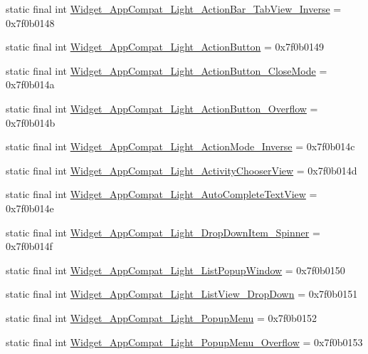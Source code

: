 \begin{CompactItemize}
static final int \hyperlink{classandroid_1_1support_1_1v4_1_1_r_1_1style_18db7314d56f1cc7a9159e040435073f}{Widget\_\-AppCompat\_\-Light\_\-ActionBar\_\-TabView\_\-Inverse} = 0x7f0b0148
\item 
static final int \hyperlink{classandroid_1_1support_1_1v4_1_1_r_1_1style_b0355e7d39a3749bd9d8311346a74916}{Widget\_\-AppCompat\_\-Light\_\-ActionButton} = 0x7f0b0149
\item 
static final int \hyperlink{classandroid_1_1support_1_1v4_1_1_r_1_1style_e76fe722735404aa8f4c087656eb64f1}{Widget\_\-AppCompat\_\-Light\_\-ActionButton\_\-CloseMode} = 0x7f0b014a
\item 
static final int \hyperlink{classandroid_1_1support_1_1v4_1_1_r_1_1style_886dcbcc523eb24224935b709498af86}{Widget\_\-AppCompat\_\-Light\_\-ActionButton\_\-Overflow} = 0x7f0b014b
\item 
static final int \hyperlink{classandroid_1_1support_1_1v4_1_1_r_1_1style_8c6b6de69a189637e6238e26d0f85fd9}{Widget\_\-AppCompat\_\-Light\_\-ActionMode\_\-Inverse} = 0x7f0b014c
\item 
static final int \hyperlink{classandroid_1_1support_1_1v4_1_1_r_1_1style_9eeb5fd5ab990f62ce6b2c217e5c7039}{Widget\_\-AppCompat\_\-Light\_\-ActivityChooserView} = 0x7f0b014d
\item 
static final int \hyperlink{classandroid_1_1support_1_1v4_1_1_r_1_1style_9fed5a8b78d4c77d3e0551b1ed65d38c}{Widget\_\-AppCompat\_\-Light\_\-AutoCompleteTextView} = 0x7f0b014e
\item 
static final int \hyperlink{classandroid_1_1support_1_1v4_1_1_r_1_1style_f7eaa4afa8090935070d7ba0bb730c1b}{Widget\_\-AppCompat\_\-Light\_\-DropDownItem\_\-Spinner} = 0x7f0b014f
\item 
static final int \hyperlink{classandroid_1_1support_1_1v4_1_1_r_1_1style_a5fa9e907e32052808879d2530ddbbe5}{Widget\_\-AppCompat\_\-Light\_\-ListPopupWindow} = 0x7f0b0150
\item 
static final int \hyperlink{classandroid_1_1support_1_1v4_1_1_r_1_1style_c3de4e5d4155a021200a47862fcc58a7}{Widget\_\-AppCompat\_\-Light\_\-ListView\_\-DropDown} = 0x7f0b0151
\item 
static final int \hyperlink{classandroid_1_1support_1_1v4_1_1_r_1_1style_54b3860a2a635420f9034111acdf7fad}{Widget\_\-AppCompat\_\-Light\_\-PopupMenu} = 0x7f0b0152
\item 
static final int \hyperlink{classandroid_1_1support_1_1v4_1_1_r_1_1style_6b45a4774d6b71cd37b48ce7f2b0504d}{Widget\_\-AppCompat\_\-Light\_\-PopupMenu\_\-Overflow} = 0x7f0b0153

\end{CompactItemize}
